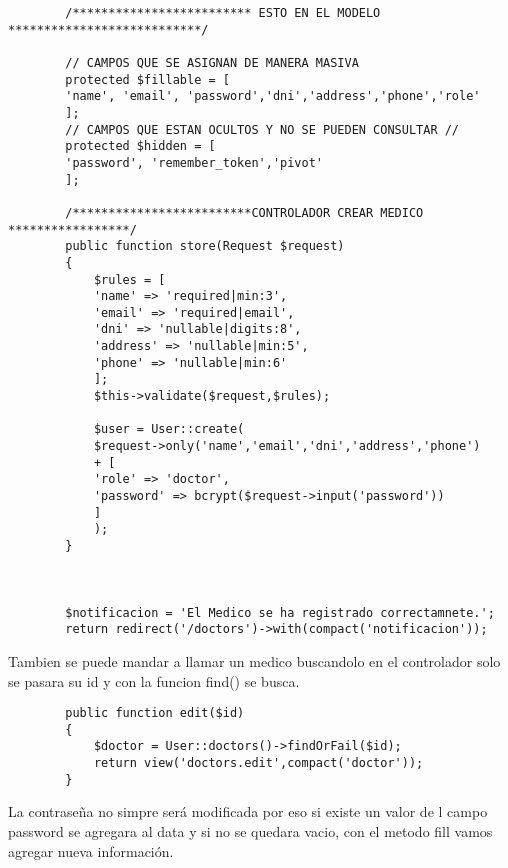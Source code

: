 \documentclass[a4paper]{article}
\begin{document}
    
    \begin{lstlisting}
    	/************************* ESTO EN EL MODELO ***************************/
    	
    	// CAMPOS QUE SE ASIGNAN DE MANERA MASIVA 
    	protected $fillable = [
    	'name', 'email', 'password','dni','address','phone','role'
    	];
    	// CAMPOS QUE ESTAN OCULTOS Y NO SE PUEDEN CONSULTAR //
    	protected $hidden = [
    	'password', 'remember_token','pivot'
    	];
    	
    	/*************************CONTROLADOR CREAR MEDICO *****************/
    	public function store(Request $request)
    	{
    		$rules = [
    		'name' => 'required|min:3',
    		'email' => 'required|email',
    		'dni' => 'nullable|digits:8',
    		'address' => 'nullable|min:5',
    		'phone' => 'nullable|min:6'
    		];
    		$this->validate($request,$rules);
    		
    		$user = User::create(
    		$request->only('name','email','dni','address','phone')
    		+ [
    		'role' => 'doctor',
    		'password' => bcrypt($request->input('password'))
    		]
    		);
    	}
    
    	
    	
    	$notificacion = 'El Medico se ha registrado correctamnete.';
    	return redirect('/doctors')->with(compact('notificacion'));
    \end{lstlisting} 

	Tambien se puede mandar a llamar un medico buscandolo en el controlador solo se pasara su id y con la funcion find() se busca.
	
	\begin{lstlisting}
		public function edit($id)
		{
			$doctor = User::doctors()->findOrFail($id);
			return view('doctors.edit',compact('doctor'));
		}
	\end{lstlisting} 

	La contraseña no simpre será modificada por eso si existe un valor de l campo password se agregara al data y si no se quedara vacio, con el metodo fill vamos agregar nueva información. 
	
\end{document}
